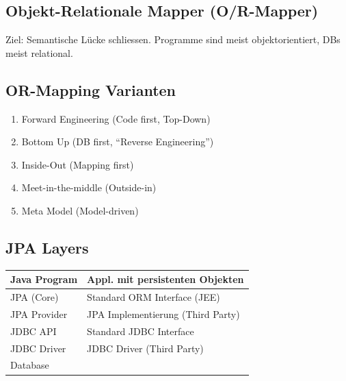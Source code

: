\documentclass[a4paper, landscape, 8pt]{scrartcl}
\begin{document}
    \begin{multicols*}{4}
        \setlength{\columnseprule}{0.4pt}
        \footnotesize

        \section{Objekt-Relationale Mapper (O/R-Mapper)}
        Ziel: Semantische Lücke schliessen.
        Programme sind meist objektorientiert, DBs meist relational.

        \subsection{OR-Mapping Varianten}
        \begin{enumerate}
            \item Forward Engineering (Code first, Top-Down)
            \item Bottom Up (DB first, \enquote{Reverse Engineering})
            \item Inside-Out (Mapping first)
            \item Meet-in-the-middle (Outside-in)
            \item Meta Model (Model-driven)
        \end{enumerate}

        \subsection{JPA Layers}
        \begin{tabular}{l | l}
            \cellcolor{darkgreen!25} Java Program & Appl. mit persistenten Objekten \\
            \hline
            \cellcolor{Blue!25} JPA (Core) & Standard ORM Interface (JEE) \\
            \hline
            \cellcolor{darkgreen!25} JPA Provider & JPA Implementierung (Third Party) \\
            \hline
            \cellcolor{Blue!25} JDBC API & Standard JDBC Interface \\
            \hline
            \cellcolor{darkgreen!25} JDBC Driver & JDBC Driver (Third Party) \\
            \hline
            \cellcolor{gray!25} Database &
        \end{tabular}


\end{multicols*}
\end{document}

